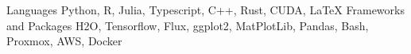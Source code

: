 
\begin{cvskills}
  \cvskill
    {Languages} %
    {Python, R, Julia, Typescript, C++, Rust, CUDA, LaTeX} %
  \cvskill
    {Frameworks and Packages} %
    {H2O, Tensorflow, Flux, ggplot2, MatPlotLib, Pandas, Bash, Proxmox, AWS, Docker} %
\end{cvskills}
